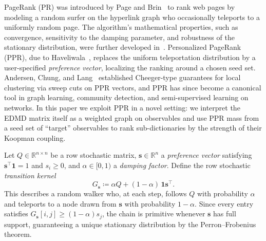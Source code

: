 \documentclass{article}
\theoremstyle{plain}
\theoremstyle{definition}
\def\R{\mathbb{R}}
\def\tp{\intercal}
\newcommand{\arXivtag}[1][]{#1}
\begin{document}
PageRank \arXivtag[(PR)] was introduced by \arXivtag[Page and Brin]~\cite{PageRank1998} to rank web pages by modeling a random surfer on the hyperlink graph who occasionally teleports to a uniformly random page. The algorithm's mathematical properties\arXivtag[, such as] convergence, sensitivity to the damping parameter, and robustness of the stationary distribution\arXivtag[,] were further developed in~\cite{langville2004deeper,ipsen2006pagerank}. 
Personalized PageRank (PPR), due to Haveliwala~\cite{haveliwala2003topic}, replaces the uniform teleportation distribution by a user-specified \emph{preference vector}, localizing the ranking around a chosen seed set. Andersen, Chung, and Lang~\cite{andersen2006local} established Cheeger-type guarantees for local clustering via sweep cuts on PPR vectors, and PPR has since become a canonical tool in graph learning, community detection, and semi-supervised learning on networks. In this paper we exploit PPR in a novel setting: we interpret the EDMD matrix itself as a weighted graph on observables and use PPR mass from a seed set of ``target'' observables to rank sub-dictionaries by the strength of their Koopman coupling.

Let $Q \in \R^{n \times n}$ be a row stochastic matrix, $\mathbf{s} \in \R^n$ a \emph{preference vector} satisfying $\mathbf{s}^\tp\mathbf{1} = 1$ and $s_i \geq 0$, and $\alpha \in [0,1)$ a \emph{damping factor}. Define the row stochastic \emph{transition kernel} 
\begin{equation}\label{eq:ppr-kernel}
	G_{\mathbf{s}} \coloneqq \alpha Q + (1-\alpha)\,\mathbf{1}\mathbf{s}^\tp.
\end{equation}
This describes a random walker who, at each step, follows $Q$ with probability $\alpha$ and teleports to a node drawn from $\mathbf{s}$ with probability $1-\alpha$. Since every entry satisfies $G_{\mathbf{s}}[i,j] \geq (1-\alpha)s_j$, the chain is primitive whenever $\mathbf{s}$ has full support, guaranteeing a unique stationary distribution by the Perron--Frobenius theorem.
\end{document}
